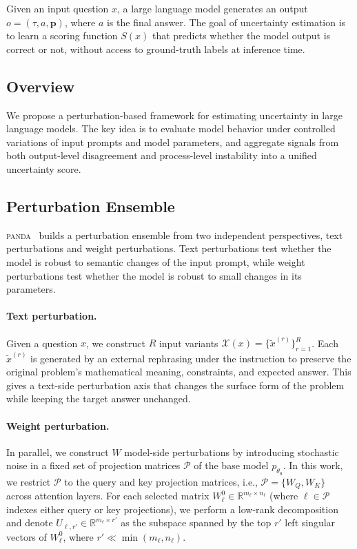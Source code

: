 \documentclass{article} %
\DeclareRobustCommand{\method}{%
  \texorpdfstring{%
    \ifmmode\text{\normalfont\textsc{panda}}\else\textsc{panda}\xspace\fi
  }{PANDA}%
}
\begin{document}
Given an input question $x$, a large language model generates an output $o = (\tau, a, \mathbf{p})$, where $a$ is the final answer. The goal of uncertainty estimation is to learn a scoring function $S(x)$ that predicts whether the model output is correct or not, without access to ground-truth labels at inference time.

\subsection{Overview}
We propose a perturbation-based framework for estimating uncertainty in large language models. The key idea is to evaluate model behavior under controlled variations of input prompts and model parameters, and aggregate signals from both output-level disagreement and process-level instability into a unified uncertainty score.

\subsection{Perturbation Ensemble}
\label{sec:perturbation-ensemble}

\method\ builds a perturbation ensemble from two independent perspectives, text
perturbations and weight perturbations.
Text perturbations test whether the model is robust to semantic changes of the
input prompt, while weight perturbations test whether the model is robust to
small changes in its parameters.

\paragraph{Text perturbation.}
Given a question $x$, we construct $R$ input variants
$\mathcal{X}(x)=\{\tilde{x}^{(r)}\}_{r=1}^{R}$.
Each $\tilde{x}^{(r)}$ is generated by an external rephrasing under the
instruction to preserve the original problem's mathematical meaning,
constraints, and expected answer.
This gives a text-side perturbation axis that changes the surface form of the
problem while keeping the target answer unchanged.

\paragraph{Weight perturbation.}
In parallel, we construct $W$ model-side perturbations by introducing stochastic noise in a fixed set of projection matrices $\mathcal{P}$ of the base model $p_{\theta_0}$. In this work, we restrict $\mathcal{P}$ to the query and key projection matrices, i.e., $\mathcal{P} = \{W_Q, W_K\}$ across attention layers. For each selected matrix $W_\ell^0 \in \mathbb{R}^{m_\ell \times n_\ell}$ (where $\ell \in \mathcal{P}$ indexes either query or key projections), we perform a low-rank decomposition and denote $U_{\ell,r'} \in \mathbb{R}^{m_\ell \times r'}$ as the subspace spanned by the top $r'$ left singular vectors of $W_\ell^0$, where $r' \ll \min(m_\ell, n_\ell)$.
\end{document}
